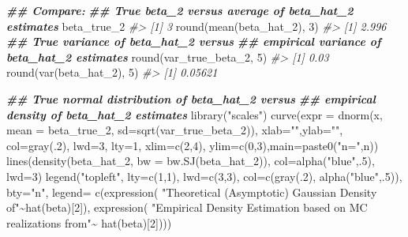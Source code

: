 \documentclass[
  14pt,
]{memoir}
\newenvironment{Shaded}{\begin{snugshade}}{\end{snugshade}}
\newcommand{\AttributeTok}[1]{\textcolor[rgb]{0.77,0.63,0.00}{#1}}
\newcommand{\CommentTok}[1]{\textcolor[rgb]{0.56,0.35,0.01}{\textit{#1}}}
\newcommand{\DecValTok}[1]{\textcolor[rgb]{0.00,0.00,0.81}{#1}}
\newcommand{\DocumentationTok}[1]{\textcolor[rgb]{0.56,0.35,0.01}{\textbf{\textit{#1}}}}
\newcommand{\FunctionTok}[1]{\textcolor[rgb]{0.00,0.00,0.00}{#1}}
\newcommand{\NormalTok}[1]{#1}
\newcommand{\SpecialCharTok}[1]{\textcolor[rgb]{0.00,0.00,0.00}{#1}}
\newcommand{\StringTok}[1]{\textcolor[rgb]{0.31,0.60,0.02}{#1}}
\begin{document}
\begin{Shaded}
\begin{Highlighting}[]
\DocumentationTok{\#\# Compare:}
\DocumentationTok{\#\# True beta\_2 versus average of beta\_hat\_2 estimates}
\NormalTok{beta\_true\_2}
\CommentTok{\#\textgreater{} [1] 3}
\FunctionTok{round}\NormalTok{(}\FunctionTok{mean}\NormalTok{(beta\_hat\_2), }\DecValTok{3}\NormalTok{)}
\CommentTok{\#\textgreater{} [1] 2.996}
\DocumentationTok{\#\# True variance of beta\_hat\_2 versus }
\DocumentationTok{\#\# empirical variance of beta\_hat\_2 estimates}
\FunctionTok{round}\NormalTok{(var\_true\_beta\_2, }\DecValTok{5}\NormalTok{)}
\CommentTok{\#\textgreater{} [1] 0.03}
\FunctionTok{round}\NormalTok{(}\FunctionTok{var}\NormalTok{(beta\_hat\_2), }\DecValTok{5}\NormalTok{)}
\CommentTok{\#\textgreater{} [1] 0.05621}

\DocumentationTok{\#\# True normal distribution of beta\_hat\_2 versus }
\DocumentationTok{\#\# empirical density of beta\_hat\_2 estimates}
\FunctionTok{library}\NormalTok{(}\StringTok{"scales"}\NormalTok{)}
\FunctionTok{curve}\NormalTok{(}\AttributeTok{expr =} \FunctionTok{dnorm}\NormalTok{(x, }\AttributeTok{mean =}\NormalTok{ beta\_true\_2, }
                   \AttributeTok{sd=}\FunctionTok{sqrt}\NormalTok{(var\_true\_beta\_2)), }
      \AttributeTok{xlab=}\StringTok{""}\NormalTok{,}\AttributeTok{ylab=}\StringTok{""}\NormalTok{, }\AttributeTok{col=}\FunctionTok{gray}\NormalTok{(.}\DecValTok{2}\NormalTok{), }\AttributeTok{lwd=}\DecValTok{3}\NormalTok{, }\AttributeTok{lty=}\DecValTok{1}\NormalTok{, }
\AttributeTok{xlim=}\FunctionTok{c}\NormalTok{(}\DecValTok{2}\NormalTok{,}\DecValTok{4}\NormalTok{), }\AttributeTok{ylim=}\FunctionTok{c}\NormalTok{(}\DecValTok{0}\NormalTok{,}\DecValTok{3}\NormalTok{),}\AttributeTok{main=}\FunctionTok{paste0}\NormalTok{(}\StringTok{"n="}\NormalTok{,n))}
\FunctionTok{lines}\NormalTok{(}\FunctionTok{density}\NormalTok{(beta\_hat\_2, }\AttributeTok{bw =} \FunctionTok{bw.SJ}\NormalTok{(beta\_hat\_2)), }
      \AttributeTok{col=}\FunctionTok{alpha}\NormalTok{(}\StringTok{"blue"}\NormalTok{,.}\DecValTok{5}\NormalTok{), }\AttributeTok{lwd=}\DecValTok{3}\NormalTok{)}
\FunctionTok{legend}\NormalTok{(}\StringTok{"topleft"}\NormalTok{, }\AttributeTok{lty=}\FunctionTok{c}\NormalTok{(}\DecValTok{1}\NormalTok{,}\DecValTok{1}\NormalTok{), }\AttributeTok{lwd=}\FunctionTok{c}\NormalTok{(}\DecValTok{3}\NormalTok{,}\DecValTok{3}\NormalTok{), }
     \AttributeTok{col=}\FunctionTok{c}\NormalTok{(}\FunctionTok{gray}\NormalTok{(.}\DecValTok{2}\NormalTok{), }\FunctionTok{alpha}\NormalTok{(}\StringTok{"blue"}\NormalTok{,.}\DecValTok{5}\NormalTok{)), }\AttributeTok{bty=}\StringTok{"n"}\NormalTok{, }\AttributeTok{legend=} 
\FunctionTok{c}\NormalTok{(}\FunctionTok{expression}\NormalTok{(}
  \StringTok{"Theoretical (Asymptotic) Gaussian Density of"}\SpecialCharTok{\textasciitilde{}}\FunctionTok{hat}\NormalTok{(beta)[}\DecValTok{2}\NormalTok{]), }
  \FunctionTok{expression}\NormalTok{(}
  \StringTok{"Empirical Density Estimation based on MC realizations from"}\SpecialCharTok{\textasciitilde{}}
  \FunctionTok{hat}\NormalTok{(beta)[}\DecValTok{2}\NormalTok{])))}
\end{Highlighting}
\end{Shaded}
\end{document}
